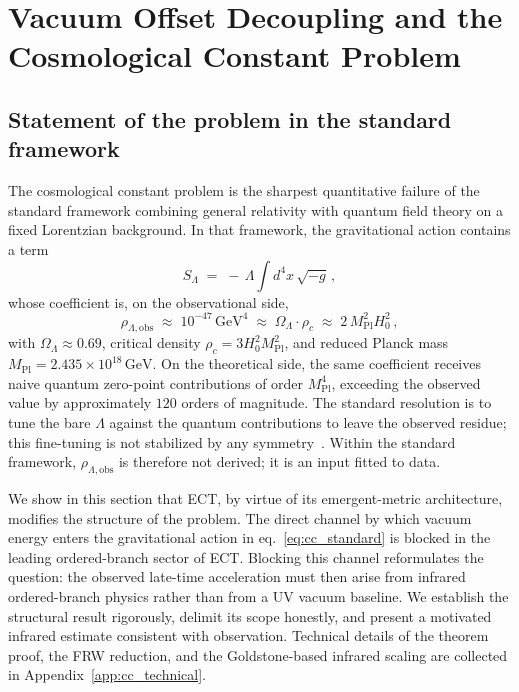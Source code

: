 
\section{Vacuum Offset Decoupling and the Cosmological Constant Problem}
\label{sec:cc_problem}

\subsection{Statement of the problem in the standard framework}
\label{subsec:cc_statement}

The cosmological constant problem is the sharpest quantitative failure of
the standard framework combining general relativity with quantum field
theory on a fixed Lorentzian background. In that framework, the
gravitational action contains a term
\begin{equation}
S_\Lambda \;=\; -\,\Lambda \int d^4 x \, \sqrt{-g}\,,
\label{eq:cc_standard}
\end{equation}
whose coefficient is, on the observational side,
\begin{equation}
\rho_{\Lambda,\mathrm{obs}} \;\approx\; 10^{-47}\,\mathrm{GeV}^4
\;\approx\; \Omega_\Lambda \cdot \rho_c
\;\approx\; 2\,M_{\mathrm{Pl}}^2 H_0^2\,,
\label{eq:rho_obs}
\end{equation}
with $\Omega_\Lambda \approx 0.69$, critical density
$\rho_c = 3 H_0^2 M_{\mathrm{Pl}}^2$, and reduced Planck mass
$M_{\mathrm{Pl}} = 2.435\times 10^{18}\,\mathrm{GeV}$. On the theoretical
side, the same coefficient receives naive quantum zero-point
contributions of order $M_{\mathrm{Pl}}^4$, exceeding the observed value
by approximately $120$ orders of magnitude. The standard resolution is
to tune the bare $\Lambda$ against the quantum contributions to leave
the observed residue; this fine-tuning is not stabilized by any
symmetry~\cite{Weinberg1989,Carroll2001,Polchinski2006}. Within the
standard framework, $\rho_{\Lambda,\mathrm{obs}}$ is therefore not
derived; it is an input fitted to data.

We show in this section that ECT, by virtue of its emergent-metric
architecture, modifies the structure of the problem. The direct channel
by which vacuum energy enters the gravitational action in
eq.~\eqref{eq:cc_standard} is blocked in the leading ordered-branch
sector of ECT. Blocking this channel reformulates the question: the
observed late-time acceleration must then arise from infrared
ordered-branch physics rather than from a UV vacuum baseline. We
establish the structural result rigorously, delimit its scope honestly,
and present a motivated infrared estimate consistent with observation.
Technical details of the theorem proof, the FRW reduction, and the
Goldstone-based infrared scaling are collected in
Appendix~\ref{app:cc_technical}.


